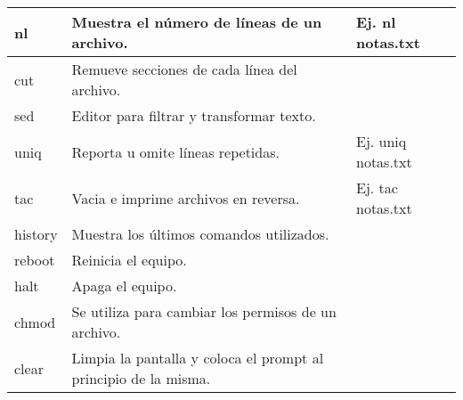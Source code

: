 \documentclass[10pt]{article}
\begin{document}
\begin{tabular}{||l|l|l||}
nl & Muestra el número de líneas de un archivo. & Ej. nl notas.txt \\ \hline
cut & Remueve secciones de cada línea del archivo. & \\ \hline
sed & Editor para filtrar y transformar texto. & \\ \hline
uniq & Reporta u omite líneas repetidas. & Ej. uniq notas.txt \\ \hline
tac & Vacia e imprime archivos en reversa. & Ej. tac notas.txt \\ \hline
history & Muestra los últimos comandos utilizados. & \\ \hline
reboot & Reinicia el equipo. & \\ \hline
halt & Apaga el equipo. & \\ \hline
chmod & Se utiliza para cambiar los permisos de un archivo. & \\ \hline
clear & Limpia la pantalla y coloca el prompt al principio de la misma. & \\ \hline \hline
\end{tabular}

\end{document}
